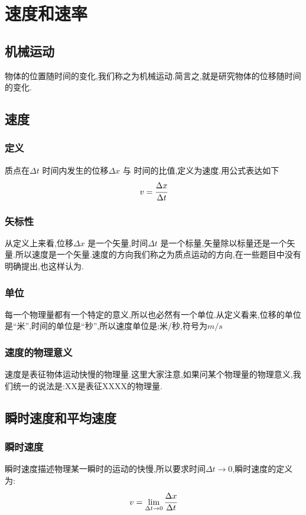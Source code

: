 \section{速度和速率}
\subsection{机械运动}
物体的位置随时间的变化,我们称之为机械运动.简言之,就是研究物体的位移随时间的变化.
\subsection{速度}
\subsubsection{定义}
质点在$\Delta t$ 时间内发生的位移$ \Delta x $ 与 时间的比值,定义为速度.用公式表达如下
\begin{equation}
  v=\cfrac{\Delta x}{\Delta t}\label{eq:velocity}
\end{equation}
\subsubsection{矢标性}
 从定义上来看,位移$\Delta x$ 是一个矢量,时间$\Delta t$ 是一个标量,矢量除以标量还是一个矢量.所以速度是一个矢量.速度的方向我们称之为质点运动的方向,在一些题目中没有明确提出,也这样认为.
 \subsubsection{单位}
 每一个物理量都有一个特定的意义,所以也必然有一个单位.从定义看来,位移的单位是``米'',时间的单位是``秒'',所以速度单位是:米/秒,符号为$m/s$
\subsubsection{速度的物理意义}
速度是表征物体运动快慢的物理量.这里大家注意,如果问某个物理量的物理意义,我们统一的说法是:XX是表征XXXX的物理量.
\subsection{瞬时速度和平均速度}
\subsubsection{瞬时速度}
瞬时速度描述物理某一瞬时的运动的快慢,所以要求时间$\Delta t \rightarrow 0$,瞬时速度的定义为:
\begin{equation}
 v=\lim_{\Delta t \to 0} \cfrac{\Delta x}{\Delta t}
  \label{eq:instantaneous velocity}
\end{equation}

